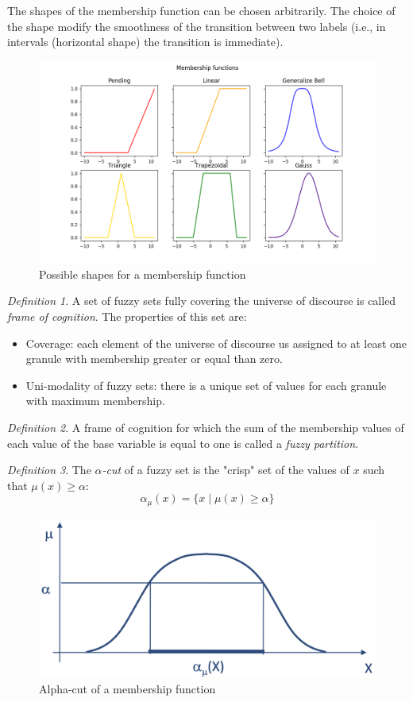 \documentclass[12pt, a4paper]{report}
\theoremstyle{remark}
\newtheorem*{remark}{Definition}
\begin{document}
    The shapes of the membership function can be chosen arbitrarily. The choice of the shape modify the smoothness of the transition 
    between two labels (i.e., in intervals (horizontal shape) the transition is immediate). 
    \begin{figure}[H]
        \centering
        \includegraphics[width=0.75\linewidth]{images/shape.png}
        \caption{Possible shapes for a membership function}
    \end{figure}
    \begin{remark}
        A set of fuzzy sets fully covering the universe of discourse is called \emph{frame of cognition}. The properties of this set are:
        \begin{itemize}
            \item Coverage: each element of the universe of discourse us assigned to at least one granule with membership greater or equal 
                than zero.
            \item Uni-modality of fuzzy sets: there is a unique set of values for each granule with maximum membership. 
        \end{itemize}
    \end{remark}
    \begin{remark}
        A frame of cognition for which the sum  of the membership values of each value of the base variable is equal to one is called 
        a \emph{fuzzy partition}. 
    \end{remark}
    \begin{remark}
        The \emph{$\alpha$-cut} of a fuzzy set is the "crisp" set of the values of $x$ such that $\mu(x) \geq \alpha$:
        \[\alpha_\mu(x)=\{x \mid \mu(x) \geq \alpha\}\]
    \end{remark}
    \begin{figure}[H]
        \centering
        \includegraphics[width=0.5\linewidth]{images/alpha.png}
        \caption{Alpha-cut of a membership function}
    \end{figure}
\end{document}
